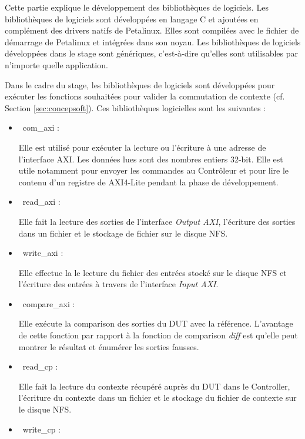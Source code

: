 Cette partie explique le développement des bibliothèques de logiciels.
Les bibliothèques de logiciels sont développées en langage C et ajoutées en complément
des drivers natifs de Petalinux. Elles sont compilées avec le fichier de démarrage de Petalinux et intégrées dans son noyau. 
Les bibliothèques de logiciels développées dans le stage sont génériques, c'est-à-dire qu'elles
sont utilisables par n'importe quelle application. 

Dans le cadre du stage, les bibliothèques de logiciels sont développées pour exécuter les fonctions
souhaitées pour valider la commutation de contexte (cf. Section \ref{sec:concepsoft}).
Ces bibliothèques logicielles sont les suivantes : 

\begin{itemize}
	\item\
	com\_axi :
	
	Elle est utilisé pour exécuter la lecture ou l'écriture à une adresse de l'interface AXI. Les données lues sont
	des nombres entiers 32-bit. Elle est utile notamment pour envoyer les commandes au Contrôleur et pour lire
	le contenu d'un registre de AXI4-Lite pendant la phase de développement.

	\item\	
	read\_axi :
	
	Elle fait la lecture des sorties de l'interface \emph{Output AXI}, 
	l'écriture des sorties dans un fichier et le stockage de fichier sur le disque NFS.
	
	\item\
	write\_axi :
	
	Elle effectue la le lecture du fichier des entrées stocké sur le disque NFS et l'écriture des entrées
	à travers de l'interface \emph{Input AXI}.

	\item\
	compare\_axi :
	
	Elle exécute la comparison des sorties du DUT avec la référence.
	L'avantage de cette fonction par rapport à la fonction de comparison \emph{diff} 
	est qu'elle peut montrer le résultat et énumérer les sorties fausses.

	\item\
	read\_cp :

	Elle fait la lecture du contexte récupéré auprès du DUT dans le Controller, 
	l'écriture du contexte dans un fichier et le stockage du fichier de contexte sur le disque NFS.
	
	\item\
	write\_cp :
	

\end{itemize}
